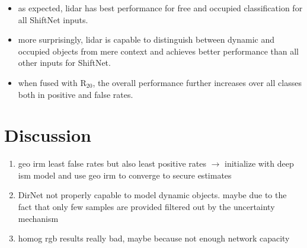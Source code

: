 \begin{itemize}
	\item as expected, lidar has best performance for free and occupied classification for all ShiftNet inputs.
	\item more surprisingly, lidar is capable to distinguish between dynamic and occupied objects from mere context and achieves better performance than all other inputs for ShiftNet. 
	\item when fused with R$_{20}$, the overall performance further increases over all classes both in positive and false rates.
\end{itemize}
%
\section{Discussion}
\label{sec:deep_ism_discussion}
\begin{enumerate}
	\item geo \gls{irm} least false rates but also least positive rates $\rightarrow$ initialize with deep \gls{ism} model and use geo \gls{irm} to converge to secure estimates
	\item DirNet not properly capable to model dynamic objects. maybe due to the fact that only few samples are provided filtered out by the uncertainty mechanism
	\item homog rgb results really bad, maybe because not enough network capacity
\end{enumerate}
